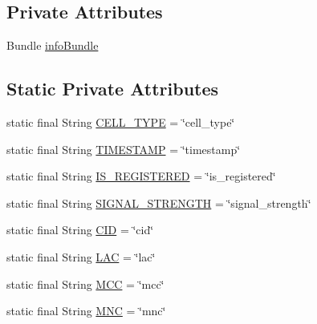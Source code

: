 \subsection*{Private Attributes}
\begin{DoxyCompactItemize}
\item 
Bundle \hyperlink{classcom_1_1qualoutdoor_1_1recorder_1_1telephony_1_1CustomCellInfo_a8acfb6c3a7dfdb3dfbc27da18f49e77e}{info\-Bundle}
\end{DoxyCompactItemize}
\subsection*{Static Private Attributes}
\begin{DoxyCompactItemize}
\item 
static final String \hyperlink{classcom_1_1qualoutdoor_1_1recorder_1_1telephony_1_1CustomCellInfo_a638ed63a0341e0753ca2c8b12ceae1bd}{C\-E\-L\-L\-\_\-\-T\-Y\-P\-E} = \char`\"{}cell\-\_\-type\char`\"{}
\item 
static final String \hyperlink{classcom_1_1qualoutdoor_1_1recorder_1_1telephony_1_1CustomCellInfo_a33a6ffe22bfac0d38f9735ff411f8f12}{T\-I\-M\-E\-S\-T\-A\-M\-P} = \char`\"{}timestamp\char`\"{}
\item 
static final String \hyperlink{classcom_1_1qualoutdoor_1_1recorder_1_1telephony_1_1CustomCellInfo_a57373f5459c9605b6881c79bc4eb51cb}{I\-S\-\_\-\-R\-E\-G\-I\-S\-T\-E\-R\-E\-D} = \char`\"{}is\-\_\-registered\char`\"{}
\item 
static final String \hyperlink{classcom_1_1qualoutdoor_1_1recorder_1_1telephony_1_1CustomCellInfo_a1dbe98f06e11635cd0158322456b3057}{S\-I\-G\-N\-A\-L\-\_\-\-S\-T\-R\-E\-N\-G\-T\-H} = \char`\"{}signal\-\_\-strength\char`\"{}
\item 
static final String \hyperlink{classcom_1_1qualoutdoor_1_1recorder_1_1telephony_1_1CustomCellInfo_a75a77bb9f669b3a1aa876a28d304515c}{C\-I\-D} = \char`\"{}cid\char`\"{}
\item 
static final String \hyperlink{classcom_1_1qualoutdoor_1_1recorder_1_1telephony_1_1CustomCellInfo_abbcac278b7713cb160b37b86696ba40a}{L\-A\-C} = \char`\"{}lac\char`\"{}
\item 
static final String \hyperlink{classcom_1_1qualoutdoor_1_1recorder_1_1telephony_1_1CustomCellInfo_ad76b1e387100db38e0a1a595549a600e}{M\-C\-C} = \char`\"{}mcc\char`\"{}
\item 
static final String \hyperlink{classcom_1_1qualoutdoor_1_1recorder_1_1telephony_1_1CustomCellInfo_afd17b782dc967deb719feb1830c4bf08}{M\-N\-C} = \char`\"{}mnc\char`\"{}

\end{DoxyCompactItemize}
